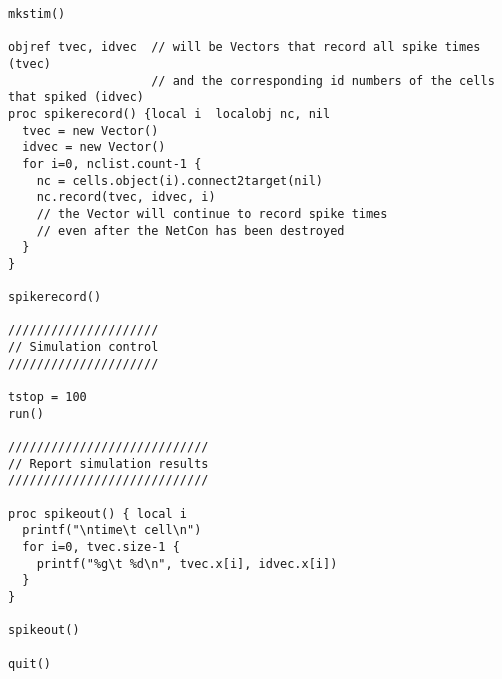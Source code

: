 \documentclass[10pt]{article}
\begin{document}
\begin{verbatim}
mkstim()

objref tvec, idvec  // will be Vectors that record all spike times (tvec)
                    // and the corresponding id numbers of the cells that spiked (idvec)
proc spikerecord() {local i  localobj nc, nil
  tvec = new Vector()
  idvec = new Vector()
  for i=0, nclist.count-1 {
    nc = cells.object(i).connect2target(nil)
    nc.record(tvec, idvec, i)
    // the Vector will continue to record spike times
    // even after the NetCon has been destroyed
  }
}

spikerecord()

/////////////////////
// Simulation control
/////////////////////

tstop = 100
run()

////////////////////////////
// Report simulation results
////////////////////////////

proc spikeout() { local i
  printf("\ntime\t cell\n")
  for i=0, tvec.size-1 {
    printf("%g\t %d\n", tvec.x[i], idvec.x[i])
  }
}

spikeout()

quit()
\end{verbatim}
\end{document}
